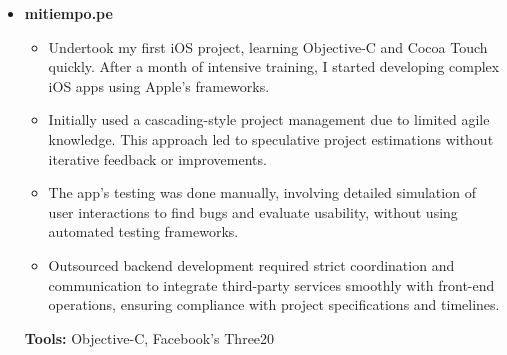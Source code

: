 \documentclass[11pt,a4paper,english]{moderncv}
\begin{document}
{\begin{itemize}
\begin{itemize}
            \item As Software Architect and Project Manager, made key decisions on codec communication protocols and conducted load testing to ensure high audio quality and performance.
            \item Managed and mentored four Junior Developers in integrating corporate branding into the application, ensuring alignment with brand strategy and corporate identity standards.
        \end{itemize}
        \textbf{Tools:} Objective-C, Three20, Linphone, C
    \item \textbf{mitiempo.pe}
        \begin{itemize}
            \item Undertook my first iOS project, learning Objective-C and Cocoa Touch quickly. After a month of intensive training, I started developing complex iOS apps using Apple's frameworks.
            \item Initially used a cascading-style project management due to limited agile knowledge. This approach led to speculative project estimations without iterative feedback or improvements.
            \item The app's testing was done manually, involving detailed simulation of user interactions to find bugs and evaluate usability, without using automated testing frameworks.
            \item Outsourced backend development required strict coordination and communication to integrate third-party services smoothly with front-end operations, ensuring compliance with project specifications and timelines.
        \end{itemize}
        \textbf{Tools:} Objective-C, Facebook’s Three20
\end{itemize}
}

\subsection{}
\end{document}
